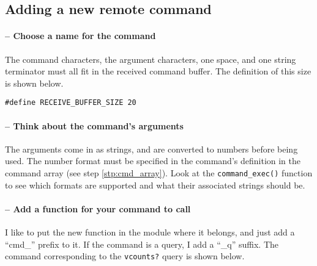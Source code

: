 \clearpage{}
\subsection{Adding a new remote command}
\setcounter{comcount}{0}

\paragraph{ --  Choose a name for the command}
The command characters, the argument characters, one space, and one
string terminator must all fit in the received command buffer. The
definition of this size is shown below.

{ \texttt{\#define RECEIVE\_BUFFER\_SIZE 20} }

\paragraph{ -- Think about the command's arguments}
The arguments come in as strings, and are converted to numbers before
being used.  The number format must be specified in the command's
definition in the command array (see step \ref{stp:cmd_array}).  Look
at the \texttt{command\_exec()} function to see which formats are
supported and what their associated strings should be.

\paragraph{ -- Add a function for your command to call}
I like to put the new function in the module where it belongs, and
just add a ``cmd\_'' prefix to it.  If the command is a query, I add a
``\_q'' suffix.  The command corresponding to the \texttt{vcounts?}
query is shown below.

